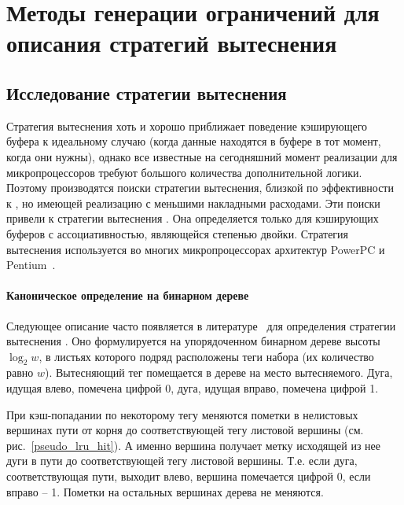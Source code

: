 
\chapter{Методы генерации ограничений для описания стратегий вытеснения}

\section{Исследование стратегии вытеснения \PseudoLRU}

Стратегия вытеснения \LRU хоть и хорошо приближает поведение
кэширующего буфера к идеальному случаю (когда данные находятся в
буфере в тот момент, когда они нужны), однако все известные на
сегодняшний момент реализации для микропроцессоров требуют большого
количества дополнительной логики. Поэтому производятся поиски
стратегии вытеснения, близкой по эффективности к \LRU, но имеющей
реализацию с меньшими накладными расходами. Эти поиски привели к
стратегии вытеснения \PseudoLRU. Она определяется только для
кэширующих буферов с ассоциативностью, являющейся степенью двойки.
Стратегия вытеснения \PseudoLRU используется во многих
микропроцессорах архитектур PowerPC и
Pentium~\cite{FundamentalOfComputerOrganizationAndDesign}.

\subsubsection{Каноническое определение \PseudoLRU на бинарном дереве}

Следующее описание часто появляется в
литературе~\cite{FundamentalOfComputerOrganizationAndDesign} для
определения стратегии вытеснения \PseudoLRU. Оно формулируется на
упорядоченном бинарном дереве высоты $\log_2 w$, в листьях которого
подряд расположены теги набора (их количество равно $w$).
Вытесняющий тег помещается в дереве на место вытесняемого. Дуга,
идущая влево, помечена цифрой 0, дуга, идущая вправо, помечена
цифрой 1.

При кэш-попадании по некоторому тегу меняются пометки в нелистовых
вершинах пути от корня до соответствующей тегу листовой вершины (см.
рис.~\ref{pseudo_lru_hit}). А именно вершина получает метку
исходящей из нее дуги в пути до соответствующей тегу листовой
вершины. Т.е. если дуга, соответствующая пути, выходит влево,
вершина помечается цифрой 0, если вправо -- 1. Пометки на остальных
вершинах дерева не меняются.

